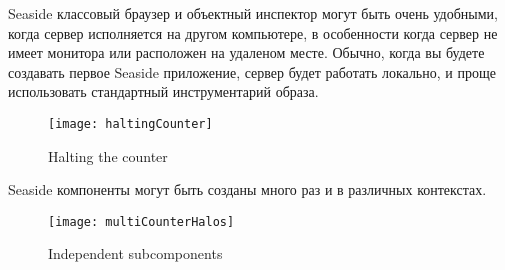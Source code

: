 \documentclass[a4paper,10pt,twoside]{book}
\begin{document}

Seaside классовый браузер и объектный инспектор могут быть очень удобными, когда сервер исполняется на другом компьютере,
в особенности когда сервер не имеет монитора или расположен на удаленом месте.
Обычно, когда вы будете создавать первое Seaside приложение, сервер будет работать локально,
и проще использовать стандартный инструментарий образа.

\begin{figure}[ht]
\begin{center}
\texttt{[image: haltingCounter]}
\caption{Halting the counter}
\end{center}
\end{figure}




Seaside компоненты могут быть созданы много раз и в различных контекстах.

\begin{figure}[ht]
\begin{center}
\texttt{[image: multiCounterHalos]}
\caption{Independent subcomponents}
\end{center}
\end{figure}
\end{document}
